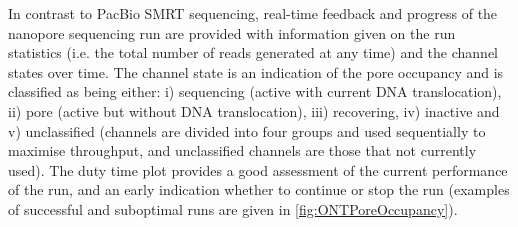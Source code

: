 \newpage
In contrast to PacBio SMRT sequencing, real-time feedback and progress of the nanopore sequencing run are provided with information given on the run statistics (i.e. the total number of reads generated at any time) and the channel states over time. The channel state is an indication of the pore occupancy and is classified as being either: i) sequencing (active with current DNA translocation), ii) pore (active but without DNA translocation), iii) recovering, iv) inactive and v) unclassified (channels are divided into four groups and used sequentially to maximise throughput, and unclassified channels are those that not currently used). The duty time plot provides a good assessment of the current performance of the run, and an early indication whether to continue or stop the run (examples of successful and suboptimal runs are given in \cref{fig:ONTPoreOccupancy}). 

